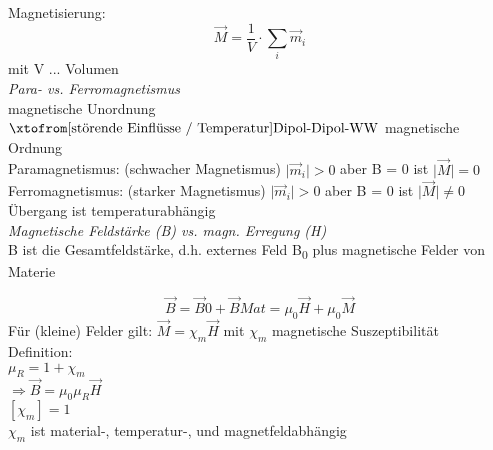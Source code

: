 \documentclass[a4paper,12pt]{report}
\begin{document}
Magnetisierung: 
\begin{equation}
\vec{M} = \frac{1}{V} \cdot \sum_i \vec{m}_i
\end{equation} 
mit V ... Volumen\\

\emph{Para- vs. Ferromagnetismus}\\
magnetische Unordnung  $\xtofrom[\text{störende Einflüsse / Temperatur}]{\text{Dipol-Dipol-WW}}$ magnetische Ordnung\\

Paramagnetismus: (schwacher Magnetismus) $ \bigl| \vec{m}_i \bigl|> 0  $ aber B = 0 ist $\bigl| \vec{M} \bigl| = 0 $\\
Ferromagnetismus: (starker Magnetismus) $ \bigl| \vec{m}_i\bigl| > 0  $ aber B = 0 ist $\bigl| \vec{M} \bigl| \neq 0 $\\
Übergang ist temperaturabhängig\\

\emph {Magnetische Feldstärke (B) vs. magn. Erregung (H) }\\
B ist die Gesamtfeldstärke, d.h. externes Feld B\textsubscript{0} plus magnetische Felder von Materie

\begin{equation}
\vec{B} = \vec{B}0 + \vec{B}{Mat} = \mu_0 \vec{H} + \mu_0 \vec{M}
\end{equation}
Für (kleine) Felder gilt: $ \vec{M} = \chi_m \vec{H} $ mit $\chi_m $ magnetische Suszeptibilität\\

Definition:\\
$\mu_R = 1+\chi_m $\\

$\Rightarrow \vec{B} = \mu_0\mu_R \vec{H} $\\

$[\chi_m] = 1$\\
$\chi_m$ ist material-, temperatur-, und magnetfeldabhängig\\
\end{document}
